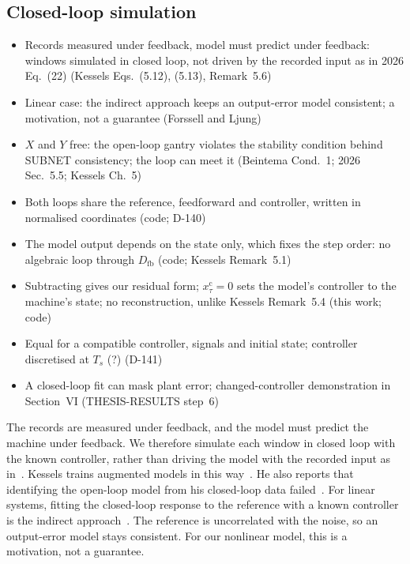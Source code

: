 \subsection{Closed-loop simulation}\label{sec:aug_loop}
\ifdraft
\begin{itemize}
\item Records measured under feedback, model must predict under feedback: windows simulated in closed loop, not driven by the recorded input as in 2026 Eq.~(22) (Kessels Eqs.~(5.12), (5.13), Remark~5.6)
\item Linear case: the indirect approach keeps an output-error model consistent; a motivation, not a guarantee (Forssell and Ljung)
\item $X$ and $Y$ free: the open-loop gantry violates the stability condition behind SUBNET consistency; the loop can meet it (Beintema Cond.~1; 2026 Sec.~5.5; Kessels Ch.~5)
\item Both loops share the reference, feedforward and controller, written in normalised coordinates (code; D-140)
\item The model output depends on the state only, which fixes the step order: no algebraic loop through $D_{\mathrm{fb}}$ (code; Kessels Remark~5.1)
\item Subtracting gives our residual form; $x^{\mathrm c}_\tau=0$ sets the model's controller to the machine's state; no reconstruction, unlike Kessels Remark~5.4 (this work; code)
\item Equal for a compatible controller, signals and initial state; controller discretised at $T_s$ (?) (D-141)
\item A closed-loop fit can mask plant error; changed-controller demonstration in Section~VI (THESIS-RESULTS step~6)
\end{itemize}
\fi

The records are measured under feedback, and the model must predict the
machine under feedback.
We therefore simulate each window in closed loop with the known controller,
rather than driving the model with the recorded input as
in~\cite[Eq.~(22)]{hoekstra2026lfr}.
Kessels trains augmented models in this
way~\cite[Eqs.~(5.12), (5.13)]{kessels2025ai}.
He also reports that identifying the open-loop model from his closed-loop data
failed~\cite[Remark~5.6]{kessels2025ai}.
For linear systems, fitting the closed-loop response to the reference with a
known controller is the indirect approach~\cite{forssell1999revisited}.
The reference is uncorrelated with the noise, so an output-error model stays
consistent.
For our nonlinear model, this is a motivation, not a guarantee.

